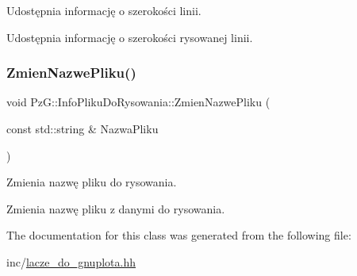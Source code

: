 Udostępnia informację o szerokości linii. 

Udostępnia informację o szerokości rysowanej linii. \mbox{\label{classPzG_1_1InfoPlikuDoRysowania_ae734c69f5cecf9c0584e3a7f433340ea}} 
\subsubsection{\texorpdfstring{Zmien\+Nazwe\+Pliku()}{ZmienNazwePliku()}}
{\footnotesize\ttfamily void Pz\+G\+::\+Info\+Pliku\+Do\+Rysowania\+::\+Zmien\+Nazwe\+Pliku (\begin{DoxyParamCaption}\item[{const std\+::string \&}]{Nazwa\+Pliku }\end{DoxyParamCaption})\hspace{0.3cm}{\ttfamily [inline]}}



Zmienia nazwę pliku do rysowania. 

Zmienia nazwę pliku z danymi do rysowania. 

The documentation for this class was generated from the following file\+:\begin{DoxyCompactItemize}
\item 
inc/\hyperlink{lacze__do__gnuplota_8hh}{lacze\+\_\+do\+\_\+gnuplota.\+hh}\end{DoxyCompactItemize}
